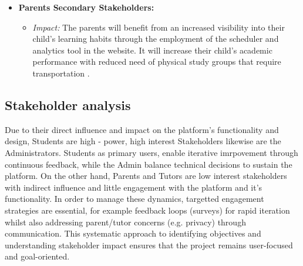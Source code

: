 \begin{itemize}
    \item \textbf{Parents {Secondary Stakeholders}:}
    \begin{itemize}
        \item \textit{Impact:} The parents will benefit from an increased visibility into their child's learning habits through the employment of the scheduler and analytics tool in the website. It will increase their child's academic performance with reduced need of physical study groups that require transportation .
    \end{itemize}
\end{itemize}  

\subsection{Stakeholder analysis}
Due to their direct influence and impact on the platform's functionality and design, Students are high - power, high interest Stakeholders likewise are the Administrators. Students as primary users, enable iterative imrpovement through continuous feedback, while the Admin balance technical decisions to sustain the platform. On the other hand, Parents and Tutors are low interest stakeholders with indirect influence and little engagement with the platform and it's functionality. In order to manage these dynamics, targetted engagement strategies are essential, for example feedback loops (surveys) for rapid iteration whilst also addressing parent/tutor concerns (e.g. privacy) through communication. This systematic approach to identifying objectives and understanding stakeholder impact ensures that the project remains user-focused and goal-oriented.

